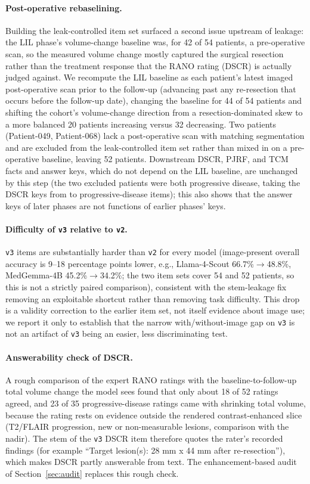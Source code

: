 \documentclass[11pt]{article}
\begin{document}
\paragraph{Post-operative rebaselining.} Building the leak-controlled item set surfaced a second issue upstream of leakage: the LIL phase's volume-change baseline was, for 42 of 54 patients, a pre-operative scan, so the measured volume change mostly captured the surgical resection rather than the treatment response that the RANO rating (DSCR) is actually judged against. We recompute the LIL baseline as each patient's latest imaged post-operative scan prior to the follow-up (advancing past any re-resection that occurs before the follow-up date), changing the baseline for 44 of 54 patients and shifting the cohort's volume-change direction from a resection-dominated skew to a more balanced 20 patients increasing versus 32 decreasing. Two patients (Patient-049, Patient-068) lack a post-operative scan with matching segmentation and are excluded from the leak-controlled item set rather than mixed in on a pre-operative baseline, leaving 52 patients. Downstream DSCR, PJRF, and TCM facts and answer keys, which do not depend on the LIL baseline, are unchanged by this step (the two excluded patients were both progressive disease, taking the DSCR keys from \dscrFiftyPD{} to \dscrVthreePD{} progressive-disease items); this also shows that the answer keys of later phases are not functions of earlier phases' keys.


\paragraph{Difficulty of \texttt{v3} relative to \texttt{v2}.} \texttt{v3} items are substantially harder than \texttt{v2} for every model (image-present overall accuracy is 9--18 percentage points lower, e.g., Llama-4-Scout 66.7\%$\to$48.8\%, MedGemma-4B 45.2\%$\to$34.2\%; the two item sets cover 54 and 52 patients, so this is not a strictly paired comparison), consistent with the stem-leakage fix removing an exploitable shortcut rather than removing task difficulty. This drop is a validity correction to the earlier item set, not itself evidence about image use; we report it only to establish that the narrow with/without-image gap on \texttt{v3} is not an artifact of \texttt{v3} being an easier, less discriminating test.



\paragraph{Answerability check of DSCR.} A rough comparison of the expert RANO ratings with the baseline-to-follow-up total volume change the model sees found that only about 18 of 52 ratings agreed, and 23 of 35 progressive-disease ratings came with shrinking total volume, because the rating rests on evidence outside the rendered contrast-enhanced slice (T2/FLAIR progression, new or non-measurable lesions, comparison with the nadir). The stem of the \texttt{v3} DSCR item therefore quotes the rater\textquoteright s recorded findings (for example ``Target lesion(s): 28 mm x 44 mm after re-resection''), which makes DSCR partly answerable from text. The enhancement-based audit of Section~\ref{sec:audit} replaces this rough check.
\end{document}
